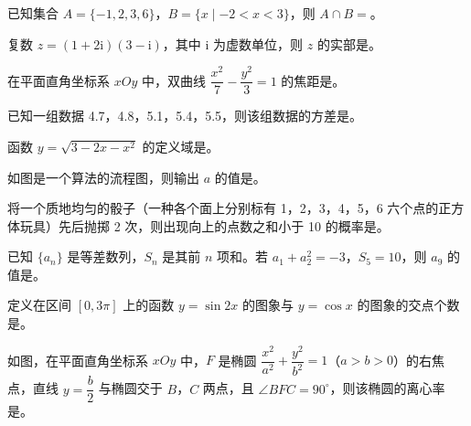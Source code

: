 \begin{question}
已知集合 \(A=\{-1,2,3,6\}\)，\(B=\{x\mid-2<x<3\}\)，则 \(A\cap B=\)\gkblank{}。

\end{question}
\begin{question}
复数 \(z=(1+2\mathrm{i})(3-\mathrm{i})\)，其中 \(\mathrm{i}\) 为虚数单位，则 \(z\) 的实部是\gkblank{}。

\end{question}
\begin{question}
在平面直角坐标系 \(xOy\) 中，双曲线 \(\dfrac{x^{2}}{7}-\dfrac{y^{2}}{3}=1\) 的焦距是\gkblank{}。

\end{question}
\begin{question}
已知一组数据 4.7，4.8，5.1，5.4，5.5，则该组数据的方差是\gkblank{}。

\end{question}
\begin{question}
函数 \(y=\sqrt{3-2x-x^{2}}\) 的定义域是\gkblank{}。

\Needspace{0.4\textheight}
\end{question}
\begin{question}
如图是一个算法的流程图，则输出 \(a\) 的值是\gkblank{}。
\nopagebreak[4]
\begin{center}\end{center}
\nopagebreak[4]
\end{question}
\begin{question}
将一个质地均匀的骰子（一种各个面上分别标有 1，2，3，4，5，6 六个点的正方体玩具）先后抛掷 2 次，则出现向上的点数之和小于 10 的概率是\gkblank{}。

\end{question}
\begin{question}
已知 \(\{a_{n}\}\) 是等差数列，\(S_{n}\) 是其前 \(n\) 项和。若 \(a_{1}+a_{2}^{2}=-3\)，\(S_{5}=10\)，则 \(a_{9}\) 的值是\gkblank{}。

\end{question}
\begin{question}
定义在区间 \([0,3\pi]\) 上的函数 \(y=\sin 2x\) 的图象与 \(y=\cos x\) 的图象的交点个数是\gkblank{}。

\Needspace{0.4\textheight}
\end{question}
\begin{question}
如图，在平面直角坐标系 \(xOy\) 中，\(F\) 是椭圆 \(\dfrac{x^{2}}{a^{2}}+\dfrac{y^{2}}{b^{2}}=1\)（\(a>b>0\)）的右焦点，直线 \(y=\dfrac{b}{2}\) 与椭圆交于 \(B\)，\(C\) 两点，且 \(\angle BFC=90^{\circ}\)，则该椭圆的离心率是\gkblank{}。
\nopagebreak[4]
\begin{center}\end{center}
\nopagebreak[4]
\end{question}
